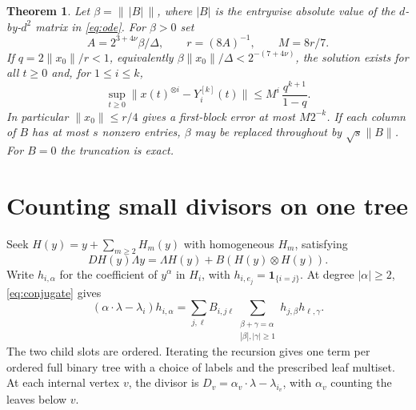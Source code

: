 \documentclass[11pt,a4paper]{article}
\newtheorem{theorem}{Theorem}
\begin{document}
\begin{theorem}\label{thm:carleman}
Let \(\beta=\|\,|B|\,\|\), where \(|B|\) is the entrywise absolute value of the \(d\)-by-\(d^2\) matrix in \eqref{eq:ode}. For \(\beta>0\) set
\[
 A=2^{3+4\nu}\beta/\Delta,\qquad r=(8A)^{-1},\qquad M=8r/7 .
\]
If \(q=2\|x_0\|/r<1\), equivalently \(\beta\|x_0\|/\Delta<2^{-(7+4\nu)}\), the solution exists for all \(t\ge0\) and, for \(1\le i\le k\),
\begin{equation}\label{eq:rate}
 \sup_{t\ge0}\big\|x(t)^{\otimes i}-Y_i^{[k]}(t)\big\|
       \le M^i\,\frac{q^{k+1}}{1-q}.
\end{equation}
In particular \(\|x_0\|\le r/4\) gives a first-block error at most \(M2^{-k}\). If each column of \(B\) has at most \(s\) nonzero entries, \(\beta\) may be replaced throughout by \(\sqrt{s}\|B\|\). For \(B=0\) the truncation is exact.
\end{theorem}

\section{Counting small divisors on one tree}
Seek \(H(y)=y+\sum_{m\ge2}H_m(y)\) with homogeneous \(H_m\), satisfying
\begin{equation}\label{eq:conjugate}
 DH(y)\Lambda y=\Lambda H(y)+B(H(y)\otimes H(y)).
\end{equation}
Write \(h_{i,\alpha}\) for the coefficient of \(y^\alpha\) in \(H_i\), with \(h_{i,e_j}=\mathbf1_{\{i=j\}}\). At degree \(|\alpha|\ge2\), \eqref{eq:conjugate} gives
\[
 (\alpha\cdot\lambda-\lambda_i)h_{i,\alpha}
  = \sum_{j,\ell} B_{i,j\ell}
     \sum_{\substack{\beta+\gamma=\alpha\\|\beta|,|\gamma|\ge1}}
       h_{j,\beta}h_{\ell,\gamma}.
\]
The two child slots are ordered. Iterating the recursion gives one term per ordered full binary tree with a choice of labels and the prescribed leaf multiset. At each internal vertex \(v\), the divisor is \(D_v=\alpha_v\cdot\lambda-\lambda_{i_v}\), with \(\alpha_v\) counting the leaves below \(v\).
\end{document}

